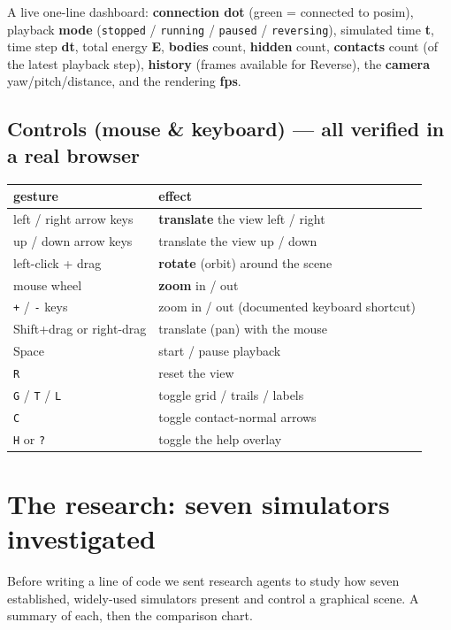 \documentclass[11pt]{article}
\newcommand{\code}[1]{\texttt{#1}}
\begin{document}
A live one-line dashboard: \textbf{connection dot} (green = connected
to posim), playback \textbf{mode} (\code{stopped} / \code{running} /
\code{paused} / \code{reversing}), simulated time \textbf{t}, time
step \textbf{dt}, total energy \textbf{E}, \textbf{bodies} count,
\textbf{hidden} count, \textbf{contacts} count (of the latest playback
step), \textbf{history} (frames available for
Reverse), the \textbf{camera} yaw/pitch/distance, and the rendering
\textbf{fps}.

\subsection{Controls (mouse \& keyboard) --- all verified in a real
browser}

\begin{center}
\begin{tabular}{lp{8.6cm}}
\textbf{gesture} & \textbf{effect}\\\hline
left / right arrow keys & \textbf{translate} the view left / right\\
up / down arrow keys & translate the view up / down\\
left-click + drag & \textbf{rotate} (orbit) around the scene\\
mouse wheel & \textbf{zoom} in / out\\
\code{+} / \code{-} keys & zoom in / out (documented keyboard shortcut)\\
Shift+drag or right-drag & translate (pan) with the mouse\\
Space & start / pause playback\\
\code{R} & reset the view\\
\code{G} / \code{T} / \code{L} & toggle grid / trails / labels\\
\code{C} & toggle contact-normal arrows\\
\code{H} or \code{?} & toggle the help overlay\\
\end{tabular}
\end{center}

\section{The research: seven simulators investigated}

Before writing a line of code we sent research agents to study how
seven established, widely-used simulators present and control a
graphical scene. A summary of each, then the comparison chart.
\end{document}
